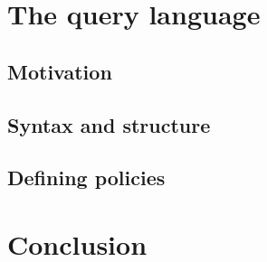 \section{The query language}


\subsection{Motivation}
\subsection{Syntax and structure}
\subsection{Defining policies}
\section{Conclusion}
